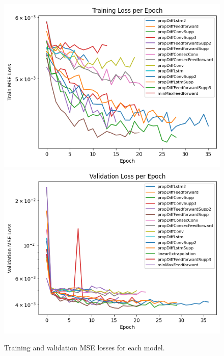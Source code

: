 \documentclass[conference]{IEEEtran}
\begin{document}
\begin{figure}
    \centering
    \includegraphics[width=\columnwidth]{figures/trainingLosses.png}
    \includegraphics[width=\columnwidth]{figures/validationLosses.png}
    \caption{Training and validation MSE losses for each model.}
    \label{figure:trainValidLosses}
\end{figure}
\end{document}
